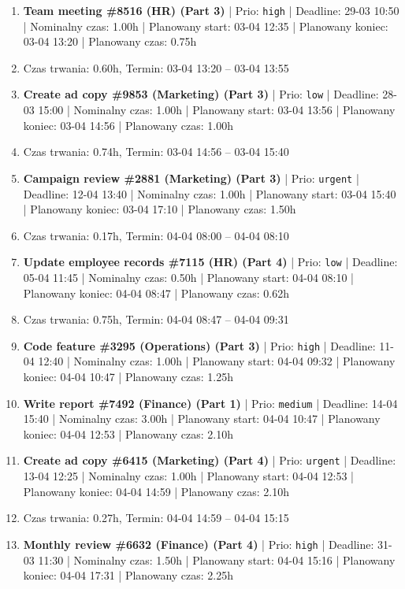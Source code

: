 {\begin{enumerate}
  \item [\textbf{14624}] \textbf{Team meeting \#8516 (HR) (Part 3)} | Prio: \texttt{high} | Deadline: 29-03 10:50 | Nominalny czas: 1.00h | Planowany start: 03-04 12:35 | Planowany koniec: 03-04 13:20 | Planowany czas: 0.75h
  \item [\textbf{PRZERWA}] Czas trwania: 0.60h, Termin: 03-04 13:20 -- 03-04 13:55
  \item [\textbf{14679}] \textbf{Create ad copy \#9853 (Marketing) (Part 3)} | Prio: \texttt{low} | Deadline: 28-03 15:00 | Nominalny czas: 1.00h | Planowany start: 03-04 13:56 | Planowany koniec: 03-04 14:56 | Planowany czas: 1.00h
  \item [\textbf{PRZERWA}] Czas trwania: 0.74h, Termin: 03-04 14:56 -- 03-04 15:40
  \item [\textbf{14599}] \textbf{Campaign review \#2881 (Marketing) (Part 3)} | Prio: \texttt{urgent} | Deadline: 12-04 13:40 | Nominalny czas: 1.00h | Planowany start: 03-04 15:40 | Planowany koniec: 03-04 17:10 | Planowany czas: 1.50h
  \item [\textbf{PRZERWA}] Czas trwania: 0.17h, Termin: 04-04 08:00 -- 04-04 08:10
  \item [\textbf{14701}] \textbf{Update employee records \#7115 (HR) (Part 4)} | Prio: \texttt{low} | Deadline: 05-04 11:45 | Nominalny czas: 0.50h | Planowany start: 04-04 08:10 | Planowany koniec: 04-04 08:47 | Planowany czas: 0.62h
  \item [\textbf{PRZERWA}] Czas trwania: 0.75h, Termin: 04-04 08:47 -- 04-04 09:31
  \item [\textbf{14608}] \textbf{Code feature \#3295 (Operations) (Part 3)} | Prio: \texttt{high} | Deadline: 11-04 12:40 | Nominalny czas: 1.00h | Planowany start: 04-04 09:32 | Planowany koniec: 04-04 10:47 | Planowany czas: 1.25h
  \item [\textbf{14642}] \textbf{Write report \#7492 (Finance) (Part 1)} | Prio: \texttt{medium} | Deadline: 14-04 15:40 | Nominalny czas: 3.00h | Planowany start: 04-04 10:47 | Planowany koniec: 04-04 12:53 | Planowany czas: 2.10h
  \item [\textbf{14602}] \textbf{Create ad copy \#6415 (Marketing) (Part 4)} | Prio: \texttt{urgent} | Deadline: 13-04 12:25 | Nominalny czas: 1.00h | Planowany start: 04-04 12:53 | Planowany koniec: 04-04 14:59 | Planowany czas: 2.10h
  \item [\textbf{PRZERWA}] Czas trwania: 0.27h, Termin: 04-04 14:59 -- 04-04 15:15
  \item [\textbf{14615}] \textbf{Monthly review \#6632 (Finance) (Part 4)} | Prio: \texttt{high} | Deadline: 31-03 11:30 | Nominalny czas: 1.50h | Planowany start: 04-04 15:16 | Planowany koniec: 04-04 17:31 | Planowany czas: 2.25h

\end{enumerate}}
